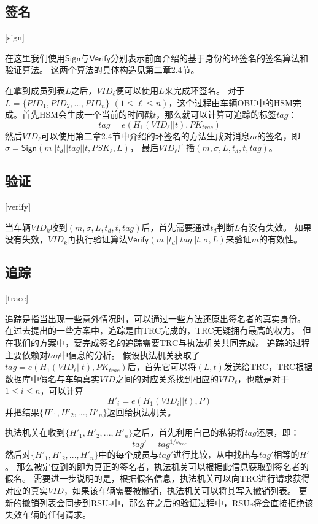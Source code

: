 \subsection{签名}[sign]

在这里我们使用$\mathsf{Sign}$与$\mathsf{Verify}$分别表示前面介绍的基于身份的环签名的签名算法和验证算法。
这两个算法的具体构造见第二章2.4节。

在拿到成员列表$L$之后，$VID_\ell$便可以使用$L$来完成环签名。
对于$L=\{PID_1,PID_2,...,PID_n\}$ $(1\leq \ell\leq n)$，这个过程由车辆OBU中的HSM完成。首先HSM会生成一个当前的时间戳$t$，那么就可以计算可追踪的标签$tag$：
\begin{equation}
tag=e(H_1(VID_\ell||t),PK_{trac})
\end{equation}
然后$VID_\ell$可以使用第二章2.4节中介绍的环签名的方法生成对消息$m$的签名，即$\sigma=\mathsf{Sign}(m||t_d||tag||t,PSK_\ell,L)$，
最后$VID_\ell$广播$(m,\sigma,L,t_d,t,tag)$。

\subsection{验证}[verify]

当车辆$VID_k$收到$(m,\sigma,L,t_d,t,tag)$后，首先需要通过$t_d$判断$L$有没有失效。
如果没有失效，$VID_k$再执行验证算法$\mathsf{Verify}(m||t_d||tag||t,\sigma,L)$来验证$m$的有效性。

\subsection{追踪}[trace]

追踪是指当出现一些意外情况时，可以通过一些方法还原出签名者的真实身份。
在过去提出的一些方案中，追踪是由TRC完成的，TRC无疑拥有最高的权力。
但在我们的方案中，要完成签名的追踪需要TRC与执法机关共同完成。
追踪的过程主要依赖对$tag$中信息的分析。
假设执法机关获取了$tag=e(H_1(VID_\ell||t),PK_{trac})$后，首先它可以将$(L,t)$发送给TRC，TRC根据数据库中假名与车辆真实$VID$之间的对应关系找到相应的$VID_\ell$，也就是对于$1\leq i \leq n$，可以计算
\begin{equation}
H'_i=e(H_1(VID_i||t),P)
\end{equation}
并把结果$\{H'_1,H'_2,...,H'_n\}$返回给执法机关。

执法机关在收到$\{H'_1,H'_2,...,H'_n\}$之后，首先利用自己的私钥将$tag$还原，即：
$$tag'=tag^{1/s_{trac}}$$
然后对$\{H'_1,H'_2,...,H'_n\}$中的每个成员与$tag'$进行比较，从中找出与$tag'$相等的$H'$。
那么被定位到的即为真正的签名者，执法机关可以根据此信息获取到签名者的假名。
需要进一步说明的是，根据假名信息，执法机关可以向TRC进行请求获得对应的真实$VID$，如果该车辆需要被撤销，执法机关可以将其写入撤销列表。
更新的撤销列表会同步到RSUs中，那么在之后的验证过程中，RSUs将会直接拒绝该失效车辆的任何请求。

